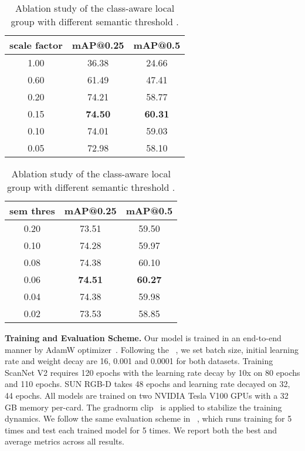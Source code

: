 \documentclass{article}
\begin{document}
\begin{table}[t]
  \begin{minipage}[b]{0.48\linewidth}
  	\caption{Ablation study of the class-aware local group with different scale factor . ()}
  	\label{tab:scale_ab}
  	\centering
  	\begin{tabular}{ccc}
    	\toprule
    	scale factor  & mAP@0.25 & mAP@0.5\\
    	\midrule
    	1.00		    & 36.38        & 24.66      \\
    	0.60   	    & 61.49        & 47.41      \\
    	0.20   		& 74.21        & 58.77      \\
    	0.15   		& \textbf{74.50}        & \textbf{60.31}      \\
    	0.10   		& 74.01        & 59.03      \\
    	0.05        & 72.98        & 58.10      \\
	
    	\bottomrule
  	\end{tabular}
  \end{minipage}
  \hspace{12pt}
  \begin{minipage}[b]{0.48\linewidth}
  	\caption{Ablation study of the class-aware local group with different semantic threshold .}
  	\label{tab:thres_ab}
  	\centering
  	\begin{tabular}{ccc}
    	\toprule
    	sem thres  & mAP@0.25 & mAP@0.5 \\
    	\midrule
    	0.20		     	& 73.51        & 59.50      \\
    	0.10  	            & 74.28        & 59.97      \\
    	0.08  	            & 74.38        & 60.10      \\
    	0.06   				& \textbf{74.51}        & \textbf{60.27}      \\
    	0.04   				& 74.38        & 59.98      \\
    	0.02  				& 73.53        & 58.85      \\
	
    	\bottomrule
  	\end{tabular}
  \end{minipage}
\end{table}

\textbf{Training and Evaluation Scheme.} Our model is trained in an end-to-end manner by AdamW optimizer~\cite{loshchilov2018decoupled}. Following the ~\cite{rukhovich2021fcaf3d}, we set batch size, initial learning rate and weight decay are 16, 0.001 and 0.0001 for both datasets. Training ScanNet V2 requires 120 epochs with the learning rate decay by 10x on 80 epochs and 110 epochs. SUN RGB-D takes 48 epochs and learning rate decayed on 32, 44 epochs. All models are trained on two NVIDIA Tesla V100 GPUs with a 32 GB memory per-card. The gradnorm clip~\cite{zhang2020_b282d173, jin2021nonconvex} is applied to stabilize the training dynamics. We follow the same evaluation scheme in ~\cite{liu2021group}, which runs training for 5 times and test each trained model for 5 times. We report both the best and average metrics across all results. 
\end{document}
